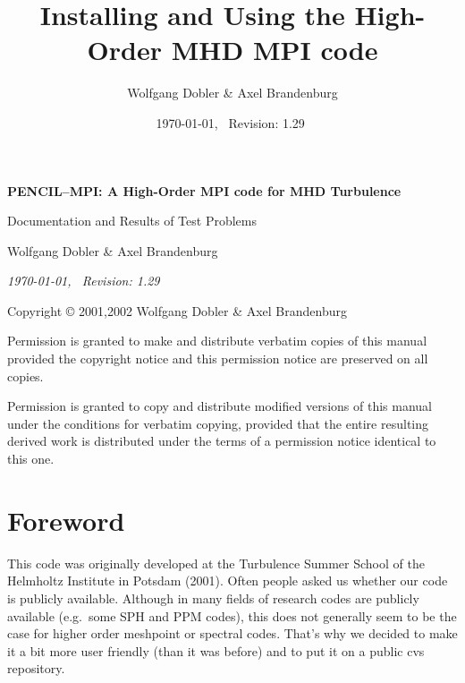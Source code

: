 \documentclass[12pt,twoside,notitlepage,a4paper]{article}
\title{{\sffamily\bfseries Installing and Using the High-Order MHD MPI code}}
\author{Wolfgang Dobler \& Axel Brandenburg}
\date{\today,~ $ $Revision: 1.29 $ $}
\begin{document}
\pagestyle{empty}


\begin{titlepage}
  \begin{center}

  \large

  \vspace*{3cm}

  {\Large\sffamily\bfseries PENCIL--MPI: A High-Order MPI code for MHD Turbulence}

  \vspace{0.5cm}

  {\sffamily Documentation and Results of Test Problems}

  \vspace{1.5cm}

  {Wolfgang Dobler \& Axel Brandenburg}


  \vspace{2cm}

  \emph{\today,~ $ $Revision: 1.29 $ $}


\end{center}

\end{titlepage}


\newpage
\mbox{}
\vfill

Copyright \copyright{} 2001,2002 Wolfgang Dobler \& Axel Brandenburg
\bigskip

Permission is granted to make and distribute verbatim copies of
this manual provided the copyright notice and this permission notice
are preserved on all copies.

Permission is granted to copy and distribute modified versions
of this manual under the conditions for verbatim copying,
provided that the entire resulting derived work is distributed under the
terms of a permission notice identical to this one.


\clearpage
\pagestyle{plain}

\section*{Foreword}

This code was originally developed at the Turbulence Summer School of the
Helmholtz Institute in Potsdam (2001).
Often people asked us whether our code is publicly available.
Although in many fields of research codes are publicly available
(e.g.\ some SPH and PPM codes), this does not generally seem to be
the case for higher order meshpoint or spectral codes.
That's why we decided to make it a bit more user friendly (than it was before)
and to put it on a public cvs repository.
\end{document}
